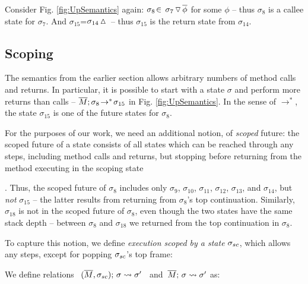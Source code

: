 {Consider Fig. \ref{fig:UpSemantics} again: $\sigma_8\!\in\!    \ {\sigma_7} \, {\triangledown}\, \overline{\phi} $ for some $\phi$ -- {thus $\sigma_8$ is a callee state for 
 $\sigma_7$}. {And $\sigma_{15}$=$\sigma_{14} \, {\vartriangle}\,$ --  thus $\sigma_{15}$ is the return state from 
 $\sigma_{14}$.}

  
 \subsection{Scoping}
 \label{sect:bounded}

{The semantics from the earlier section allows arbitrary numbers of method calls and returns. 
In particular, it is possible to start with a state $\sigma$ and perform more returns than calls --
\eg $\overline{M};\sigma_{8}\! \rightarrow^*\! {\sigma_{15}}$  in  Fig. \ref{fig:UpSemantics}.
{In the sense of $\rightarrow^*$,  the state $\sigma_{15}$  is one of the future  states for $\sigma_8$.}

 
{For} the purposes of our work, we   need an {additional} notion, of  \emph{scoped} future:  
the scoped future of a state consists of all states which  can be reached through any   
 steps, including method calls and returns, but   {stopping before returning}   
from the method executing in the scoping state}. 
Thus, the {scoped} future  of $\sigma_8$   includes only
  $\sigma_9$, $\sigma_{10}$, $\sigma_{11}$, $\sigma_{12}$, $\sigma_{13}$, and $\sigma_{14}$, but \emph{not} $\sigma_{15}$  -- the latter results from returning from $\sigma_{8}$'s top continuation.  
 {Similarly, $\sigma_{18}$ is not in the scoped future of $\sigma_8$, even though the two states have the same stack depth -- between $\sigma_{8}$  and  $\sigma_{18}$ we returned from the top continuation in $\sigma_{8}$.}
 
 

To capture this  notion, we define    {\emph{execution scoped by a state} $\sigma_{sc}$, which  allows any steps, except for popping   $\sigma_{sc}$'s top frame:}
 
 
\begin{definition}
\label{def:shallow:term}
We define relations \    $(\overline{M}, \sigma_{sc});\, {\sigma} \rightsquigarrow \sigma'$ \ and\  $\overline{M};\, {\sigma} \rightsquigarrow \sigma'$ as:


\end{definition}}
